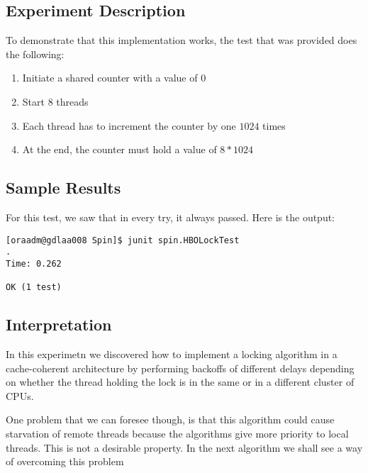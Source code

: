 \subsection{Experiment Description}
\par
To demonstrate that this implementation works, the test that was provided does the following:
\begin{enumerate}
\item Initiate a shared counter with a value of $0$
\item Start $8$ threads
\item Each thread has to increment the counter by one $1024$ times
\item At the end, the counter must hold a value of $8*1024$
\end{enumerate}
\par
\subsection{Sample Results}
\par
For this test, we saw that in every try, it always passed. Here is the output:
\par
\begin{verbatim}
[oraadm@gdlaa008 Spin]$ junit spin.HBOLockTest
.
Time: 0.262

OK (1 test)
\end{verbatim}
\par
\subsection{Interpretation}
\par
In this experimetn we discovered how to implement a locking algorithm in a
cache-coherent architecture by performing backoffs of different delays depending
on whether the thread holding the lock is in the same or in a different cluster
of CPUs. 
\par
One problem that we can foresee though, is that this algorithm could cause
starvation of remote threads because the algorithms give more priority to local
threads. This is not a desirable property. In the next algorithm we shall see a
way of overcoming this problem
